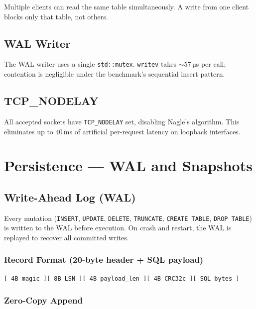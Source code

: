 \documentclass[12pt,a4paper]{article}
\begin{document}
Multiple clients can read the same table simultaneously. A write from one client blocks
only that table, not others.

\subsection{WAL Writer}

The WAL writer uses a single \texttt{std::mutex}. \texttt{writev} takes $\sim$57\,µs per
call; contention is negligible under the benchmark's sequential insert pattern.

\subsection{TCP\_NODELAY}

All accepted sockets have \texttt{TCP\_NODELAY} set, disabling Nagle's algorithm. This
eliminates up to 40\,ms of artificial per-request latency on loopback interfaces.

\section{Persistence — WAL and Snapshots}

\subsection{Write-Ahead Log (WAL)}

Every mutation (\texttt{INSERT}, \texttt{UPDATE}, \texttt{DELETE}, \texttt{TRUNCATE},
\texttt{CREATE TABLE}, \texttt{DROP TABLE}) is written to the WAL before execution.
On crash and restart, the WAL is replayed to recover all committed writes.

\subsubsection*{Record Format (20-byte header + SQL payload)}

\begin{lstlisting}[language={}]
[ 4B magic ][ 8B LSN ][ 4B payload_len ][ 4B CRC32c ][ SQL bytes ]
\end{lstlisting}

\subsubsection*{Zero-Copy Append}
\end{document}

